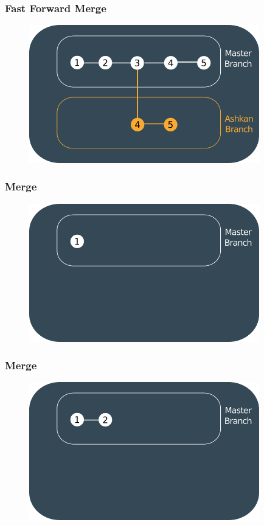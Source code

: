 \documentclass{beamer}
\begin{document}
	\begin{frame}
		\frametitle{Fast Forward Merge}
		\begin{figure}[htbp]
			\centering
			\includegraphics[width=10cm]{fastforwardmerge1}
		\end{figure}
	\end{frame}
	
	\begin{frame}
		\frametitle{Merge}
		\begin{figure}[htbp]
			\centering
			\includegraphics[width=10cm]{howgitwork9}
		\end{figure}
	\end{frame}
	
	\begin{frame}
		\frametitle{Merge}
		\begin{figure}[htbp]
			\centering
			\includegraphics[width=10cm]{howgitwork10}
		\end{figure}
	\end{frame}
	
\end{document}
